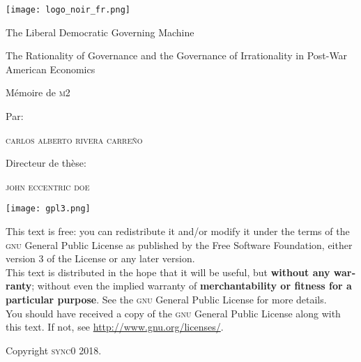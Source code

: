 \documentclass[paper=A4,portrait,twoside=true,twocolumn=false,headinclude=false,footinclude=false,fontsize=11,BCOR=15mm,DIV=calc,pagesize=auto,titlepage=firstiscover,mpinclude=true,headings=big,headings=twolinechapter,open=right,chapterprefix=false,headsepline=false,parskip=full]{scrbook}
\author{Carlos Alberto Rivera Carreño}
\date{}
\title{}
\begin{document}
\begin{titlepage}
 \centering
 \texttt{[image: logo\_noir\_fr.png]}\par
 \vspace{4\baselineskip}
 {\Huge The Liberal Democratic Governing Machine \par}
 \vspace{1\baselineskip}
 {\Large The Rationality of Governance and the Governance of Irrationality in Post-War American Economics \par}
\vspace*{\fill}
 {\Large Mémoire de \textsc{m2} \par}
 \vspace{2\baselineskip}
 {\large Par: \par}
 {\large \textsc{carlos alberto rivera carreño}\par}
 \vspace{1\baselineskip}
 {\large Directeur de thèse: \par}
 {\large \textsc{john eccentric doe}\par}
\end{titlepage}

\vspace*{\fill}
\noindent
\texttt{[image: gpl3.png]}\par
\vspace{1\baselineskip}
\begin{english}
\noindent
This text is free: you can redistribute it and/or modify it
under the terms of the \textsc{gnu} General Public License as published by
the Free Software Foundation, either version 3 of the License or any later
version. \\

\noindent
This text is distributed in the hope that it will be useful, but \textbf{without
any warranty}; without even the implied warranty of \textbf{merchantability or 
fitness for a particular purpose}. See the \textsc{gnu} General 
Public License for more details. \\

\noindent
You should have received a copy of the \textsc{gnu} General Public License along
with this text. If not, see \url{http://www.gnu.org/licenses/}.

\vspace{1\baselineskip}
\noindent
Copyright \textcopyright \textsc{sync0} 2018. 
\end{english}

\thispagestyle{empty}
\end{document}
